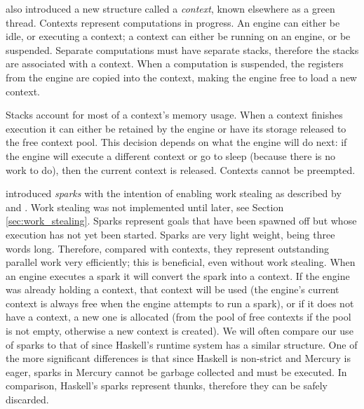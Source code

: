 \citet{conway:2002:par} also introduced a new structure called a
\emph{context}, known elsewhere as a green thread.
Contexts represent computations in progress.
An engine can either be idle, or executing a context;
a context can either be running on an engine, or be suspended.
Separate computations must have separate stacks,
therefore the stacks are associated with a context.
When a computation is suspended,
the registers from the engine are copied into the context,
making the engine free to load a new context.

Stacks account for most of a context's memory usage.
When a context finishes execution
it can either be retained by the engine or
have its storage released to the free context pool.
This decision depends on what the engine will do next:
if the engine will execute a different context or go to sleep
(because there is no work to do),
then the current context is released.
Contexts cannot be preempted.

\citet{wang_hons_thesis} introduced \emph{sparks} with the intention of
enabling work stealing as described by
\citet{blumofe:1994:work-stealing,halstead:1985:multilisp}
and \citet{kranz:1989:mul-t_article}.
Work stealing was not implemented until later, see Section
\ref{sec:work_stealing}.
Sparks represent goals that have been spawned off
but whose execution has not yet been started.
Sparks are very light weight,
being three words long.
Therefore, compared with contexts,
they represent outstanding parallel work very efficiently;
this is beneficial, even without work stealing.
When an engine executes a spark it will convert the spark into a context.
If the engine was already holding a context,
that context will be used
(the engine's current context is always free when the engine attempts to run
a spark),
or if it does not have a context,
a new one is allocated
(from the pool of free contexts if the pool is not empty,
otherwise a new context is created).
We will often compare our use of sparks to that of
\citet{simonmar_2009_multicore_rts} since Haskell's runtime system has a
similar structure.
One of the more significant differences
is that since Haskell is non-strict and Mercury is eager,
sparks in Mercury cannot be garbage collected and must be executed.
In comparison,
Haskell's sparks represent thunks, therefore they can be safely discarded.

